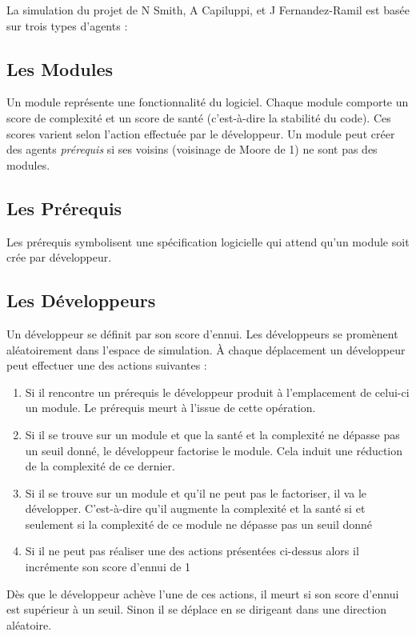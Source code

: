 \documentclass{article}
\begin{document}
La simulation du projet de N Smith, A Capiluppi, et J Fernandez-Ramil est basée sur trois types d'agents :

\subsection{Les Modules}
Un module représente une fonctionnalité du logiciel. Chaque module comporte un score de complexité et un score de santé (c'est-à-dire la stabilité du code). Ces scores varient selon l'action effectuée par le développeur. Un module peut créer des agents \textit{prérequis} si ses voisins (voisinage de Moore de 1) ne sont pas des modules.

\newpage

\subsection{Les Prérequis}
Les prérequis symbolisent une spécification logicielle qui attend qu'un module soit crée par développeur.

\subsection{Les Développeurs}
Un développeur se définit par son score d'ennui. Les développeurs se promènent aléatoirement dans l'espace de simulation. À chaque déplacement un développeur peut effectuer une des actions suivantes :

\begin{enumerate}
  \item Si il rencontre un prérequis le développeur produit à l'emplacement de celui-ci un module. Le prérequis meurt à l'issue de cette opération.
  \item{Si il se trouve sur un module et que la santé et la complexité ne dépasse pas un seuil donné, le développeur factorise le module. Cela induit une réduction de la complexité de ce dernier.}
  \item{Si il se trouve sur un module et qu'il ne peut pas le factoriser, il va le développer. C'est-à-dire qu'il augmente la complexité et la santé si et seulement si la complexité de ce module ne dépasse pas un seuil donné}
  \item{Si il ne peut pas réaliser une des actions présentées ci-dessus alors il incrémente son score d'ennui de 1}
\end{enumerate}

Dès que le développeur achève l'une de ces actions, il meurt si son score d'ennui est supérieur à un seuil. Sinon il se déplace en se dirigeant dans une direction aléatoire.
\end{document}
